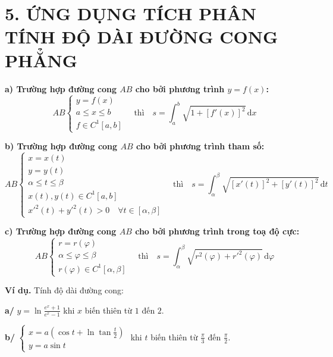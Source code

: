 \section*{5. ỨNG DỤNG TÍCH PHÂN TÍNH ĐỘ DÀI ĐƯỜNG CONG PHẲNG}

\noindent\textbf{a) Trường hợp đường cong $AB$ cho bởi phương trình $y = f(x)$:}
\[
AB \begin{cases} 
y = f(x) \\ 
a \le x \le b \\ 
f \in C^1[a, b] 
\end{cases} 
\quad \text{thì} \quad 
s = \int_{a}^{b} \sqrt{1 + [f'(x)]^2} \, \mathrm{d}x \tag{3}
\]

\bigskip

\noindent\textbf{b) Trường hợp đường cong $AB$ cho bởi phương trình tham số:}
\[
AB \begin{cases} 
x = x(t) \\ 
y = y(t) \\ 
\alpha \le t \le \beta \\ 
x(t), y(t) \in C^1[a, b] \\ 
x'^2(t) + y'^2(t) > 0 \quad \forall t \in [\alpha, \beta] 
\end{cases} 
\quad \text{thì} \quad 
s = \int_{\alpha}^{\beta} \sqrt{[x'(t)]^2 + [y'(t)]^2} \, \mathrm{d}t \tag{4}
\]

\bigskip

\noindent\textbf{c) Trường hợp đường cong $AB$ cho bởi phương trình trong toạ độ cực:}
\[
AB \begin{cases} 
r = r(\varphi) \\ 
\alpha \le \varphi \le \beta \\ 
r(\varphi) \in C^1[\alpha, \beta] 
\end{cases} 
\quad \text{thì} \quad 
s = \int_{\alpha}^{\beta} \sqrt{r^2(\varphi) + r'^2(\varphi)} \, \mathrm{d}\varphi \tag{5}
\]

\bigskip

\noindent\textbf{Ví dụ.} Tính độ dài đường cong:

\noindent\textbf{a/} $y = \ln \frac{e^x + 1}{e^x - 1}$ khi $x$ biến thiên từ $1$ đến $2$.

\noindent\textbf{b/} 
$\begin{cases} 
x = a\left(\cos t + \ln \tan \frac{t}{2}\right) \\ 
y = a \sin t 
\end{cases}$ 
khi $t$ biến thiên từ $\frac{\pi}{3}$ đến $\frac{\pi}{2}$.

\bigskip

